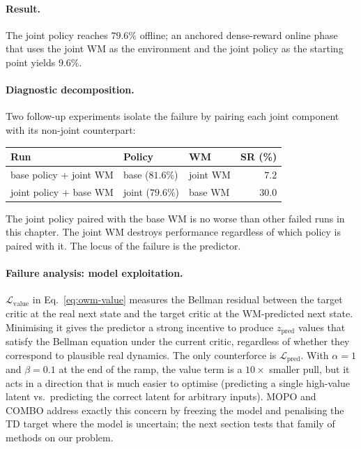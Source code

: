 \paragraph{Result.}
The joint policy reaches $79.6\%$ offline; an anchored dense-reward
online phase that uses the joint WM as the environment and the joint
policy as the starting point yields $9.6\%$.

\paragraph{Diagnostic decomposition.}
Two follow-up experiments isolate the failure by pairing each joint
component with its non-joint counterpart:
\begin{center}
\begin{tabular}{lll r}
\toprule
Run & Policy & WM & SR (\%) \\
\midrule
base policy + joint WM  & base ($81.6\%$) & joint WM &  $7.2$ \\
joint policy + base WM  & joint ($79.6\%$) & base WM & $30.0$ \\
\bottomrule
\end{tabular}
\end{center}
The joint policy paired with the base WM is no worse than other failed
runs in this chapter. The joint WM destroys performance regardless of
which policy is paired with it. The locus of the failure is the
predictor.

\paragraph{Failure analysis: model exploitation.}
$\mathcal{L}_{\text{value}}$ in Eq.~\eqref{eq:owm-value} measures the
Bellman residual between the target critic at the real next state and
the target critic at the WM-predicted next state. Minimising it gives
the predictor a strong incentive to produce $z_{\text{pred}}$ values
that satisfy the Bellman equation under the current critic, regardless
of whether they correspond to plausible real dynamics. The only
counterforce is $\mathcal{L}_{\text{pred}}$. With $\alpha=1$ and
$\beta=0.1$ at the end of the ramp, the value term is a $10\times$
smaller pull, but it acts in a direction that is much easier to
optimise (predicting a single high-value latent vs.\ predicting the
correct latent for arbitrary inputs). MOPO
\cite{yu2020mopomodelbasedofflinepolicy} and COMBO
\cite{yu2021combo} address exactly this concern by freezing the model
and penalising the TD target where the model is uncertain; the next
section tests that family of methods on our problem.

